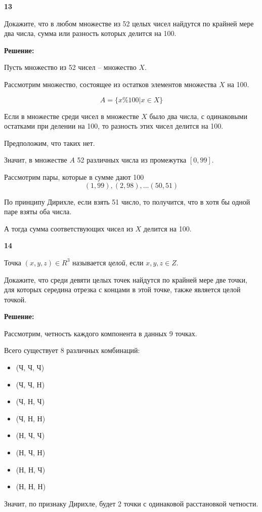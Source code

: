 \documentclass{article}
\begin{document}
\textbf{13}

Докажите, что в любом множестве из 52 целых чисел найдутся по крайней мере два числа, сумма или разность которых делится на 100.

\textbf{Решение:}

Пусть множество из 52 чисел -- множество $X$. 

Рассмотрим множество, состоящее из остатков элементов множества  $X$ на 100. 

$$ A = \{ x \% 100 | x \in X \}$$

Если в множестве среди чисел в множестве $X$ было два числа, с одинаковыми остатками при делении на 100, то разность этих чисел делится на 100. 

Предположим, что таких нет.

Значит, в множестве $A$ 52 различных числа  из промежутка $[0, 99]$. 

Рассмотрим пары, которые в сумме дают 100 $$(1, 99), (2, 98), ... (50, 51)$$

По принципу Дирихле, если взять 51 число, то получится, что в хотя бы одной паре взяты оба числа. 

А тогда сумма соответствующих чисел из $X$ делится на 100.

\newpage

\textbf{14}

Точка $(x, y, z) \in R^3$ называется \textit{целой}, если $x, y, z \in Z$.

Докажите, что среди девяти целых точек найдутся по крайней мере две точки, для которых середина отрезка с концами в этой точке, также является целой точкой. 

\textbf{Решение:}

Рассмотрим, четность каждого компонента в данных 9 точках. 

Всего существует 8 различных комбинаций: 

\begin{itemize}
    \item (Ч, Ч, Ч)
    \item (Ч, Ч, Н)
    \item (Ч, Н, Ч)
    \item (Ч, Н, Н)
    \item (Н, Ч, Ч)
    \item (Н, Ч, Н)
    \item (Н, Н, Ч)
    \item (Н, Н, Н)
\end{itemize}

Значит, по признаку Дирихле, будет 2 точки с одинаковой расстановкой четности. 
\end{document}
